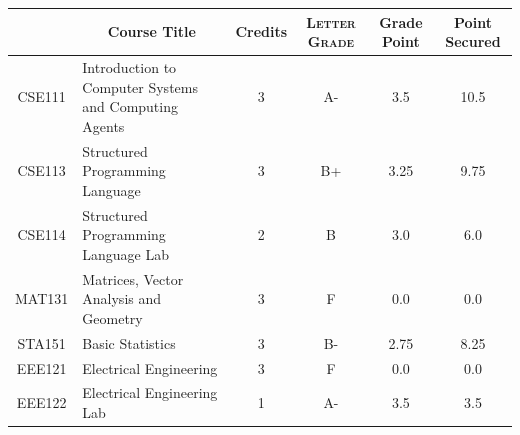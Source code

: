\documentclass[11pt]{article}
\newcommand*{\numtwo}[1]{\pgfmathprintnumber[
                    fixed, precision=2, fixed zerofill=true]{#1}}
\begin{document}
                \begin{center}
                    \renewcommand{\arraystretch}{1.08}
                    
                \begin{tabular}{|c|l|c|>{\scshape}c|c|c|}
                \hline  \rule[-1ex]{0pt}{3.5ex} {\centering{\bf Course Code}} &  \multicolumn{1}{c|}{\textbf{Course Title}}  & {\bf Credits} & {\bf Letter Grade} & {\bf Grade Point} & {\bf Point Secured}  \\ 
                \hline   CSE111 &  Introduction to Computer Systems and Computing Agents		 & 3 & A- & 3.5 & 10.5 \\ %
                \hline   CSE113 &  Structured Programming Language		 & 3 & B+ & 3.25 & 9.75 \\ %
                \hline   CSE114 &  Structured Programming Language Lab		 & 2 & B & 3.0 & 6.0 \\ %
                \hline   MAT131 &  Matrices, Vector Analysis and Geometry		 & 3 & F & 0.0 & 0.0 \\ %
                \hline   STA151 &  Basic Statistics		 & 3 & B- & 2.75 & 8.25 \\ %
                \hline   EEE121 &  Electrical Engineering		 & 3 & F & 0.0 & 0.0 \\ %
                \hline   EEE122 &  Electrical Engineering Lab		 & 1 & A- & 3.5 & 3.5 \\ %

\hline                %
                \end{tabular}
                \end{center}
                \renewcommand{\arraystretch}{1.03}
\end{document}
